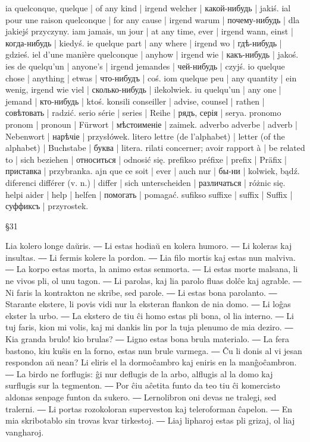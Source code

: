 ia quelconque, quelque | of any kind | irgend welcher | какой-нибудь | jakiś.
ial pour une raison quelconque | for any cause | irgend warum | почему-нибудь | dla jakiejś przyczyny.
iam jamais, un jour | at any time, ever | irgend wann, einst | когда-нибудь | kiedyś.
ie quelque part | any where | irgend wo | гдѣ-нибудь | gdzieś.
iel d’une manière quelconque | anyhow | irgend wie | какъ-нибудь | jakoś.
ies de quelqu’un | anyone’s | irgend jemandes | чей-нибудь | czyjś.
io quelque chose | anything | etwas | что-нибудъ | coś.
iom quelque peu | any quantity | ein wenig, irgend wie viel | сколько-нибудь | ilekolwiek.
iu quelqu’un | any one | jemand | кто-нибудь | ktoś.
konsili conseiller | advise, counsel | rathen | совѣтовать | radzić.
serio série | series | Reihe | рядъ, серія | serya.
pronomo pronom | pronoun | Fürwort | мѣстоименіе | zaimek.
adverbo adverbe | adverb | Nebenwort | нарѣчіе | przysłówek.
litero lettre (de l’alphabet) | letter (of the alphabet) | Buchstabe | буква | litera.
rilati concerner; avoir rapport à | be related to | sich beziehen | относиться | odnosić się.
prefikso préfixe | prefix | Präfix | приставка | przybranka.
ajn que ce soit | ever | auch nur | бы-ни | kolwiek, bądź.
diferenci différer (v. n.) | differ | sich unterscheiden | различаться | różnic się.
helpi aider | help | helfen | помогать | pomagać.
sufikso suffixe | suffix | Suffix | суффиксъ | przyrostek.

§31

Lia kolero longe daŭris. ― Li estas hodiaŭ en kolera humoro. ― Li koleras kaj insultas. ― Li fermis kolere la pordon. ― Lia filo mortis kaj estas nun malviva. ― La korpo estas morta, la animo estas senmorta. ― Li estas morte malsana, li ne vivos pli, ol unu tagon. ― Li parolas, kaj lia parolo fluas dolĉe kaj agrable. ― Ni faris la kontrakton ne skribe, sed parole. ― Li estas bona parolanto. ― Starante ekstere, li povis vidi nur la eksteran flankon de nia domo. ― Li loĝas ekster la urbo. ― La ekstero de tiu ĉi homo estas pli bona, ol lia interno. ― Li tuj faris, kion mi volis, kaj mi dankis lin por la tuja plenumo de mia deziro. ― Kia granda brulo! kio brulas? ― Ligno estas bona brula materialo. ― La fera bastono, kiu kuŝis en la forno, estas nun brule varmega. ― Ĉu li donis al vi jesan respondon aŭ nean? Li eliris el la dormoĉambro kaj eniris en la manĝoĉambron. ― La birdo ne forflugis: ĝi nur deflugis de la arbo, alflugis al la domo kaj surflugis sur la tegmenton. ― Por ĉiu aĉetita funto da teo tiu ĉi komercisto aldonas senpage funton da sukero. ― Lernolibron oni devas ne tralegi, sed tralerni. ― Li portas rozokoloran superveston kaj teleroforman ĉapelon. ― En mia skribotablo sin trovas kvar tirkestoj. ― Liaj lipharoj estas pli grizaj, ol liaj vangharoj.

